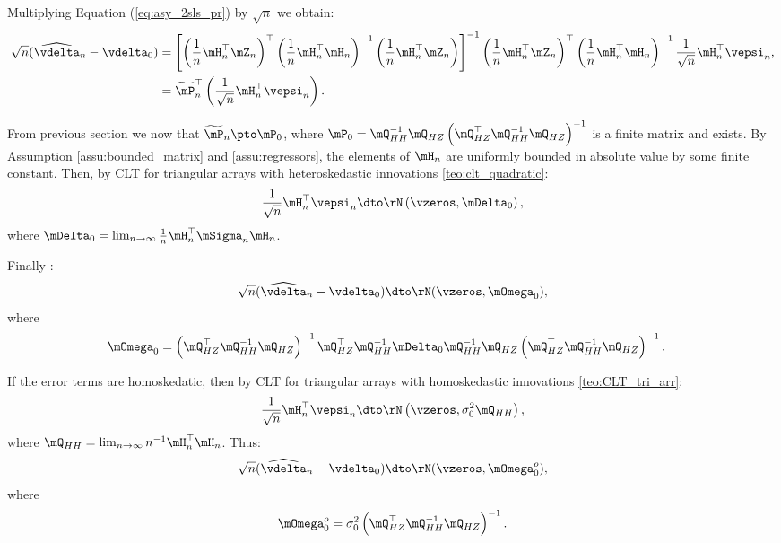 Multiplying Equation (\ref{eq:asy_2sls_pr}) by $\sqrt{n}$ we obtain:
\begin{equation}\label{eq:asy_2sls_pr2}
\begin{aligned}
\sqrt{n}(\widehat{\vdelta}_{n} - \vdelta_0) & = \left[\left(\frac{1}{n}\mH^\top_n\mZ_n\right)^\top\left(\frac{1}{n}\mH^\top_n\mH_n\right)^{-1}\left(\frac{1}{n}\mH^\top_n\mZ_n\right)\right]^{-1}\left(\frac{1}{n}\mH^\top_n\mZ_n\right)^\top\left(\frac{1}{n}\mH^\top_n\mH_n\right)^{-1}\frac{1}{\sqrt{n}}\mH^\top_n\vepsi_n, \\
             & = \widetilde{\mP}^\top_n\left(\frac{1}{\sqrt{n}}\mH^\top_n\vepsi_n\right).
\end{aligned}
\end{equation}

From previous section we now that $\widetilde{\mP}_n\pto \mP_0$, where $\mP_0=\mQ_{HH}^{-1}\mQ_{HZ}\left(\mQ_{HZ}^\top\mQ_{HH}^{-1}\mQ_{HZ}\right)^{-1}$ is a finite matrix and exists. By Assumption \ref{assu:bounded_matrix} and \ref{assu:regressors}, the elements of $\mH_n$ are uniformly bounded in absolute value by some finite constant. Then, by CLT for triangular arrays with heteroskedastic innovations \ref{teo:clt_quadratic}:
\begin{equation*}
\frac{1}{\sqrt{n}}\mH_n^\top\vepsi_n \dto \rN\left(\vzeros, \mDelta_0\right),
\end{equation*}
%
where $\mDelta_0 = \lim_{n\to\infty} \frac{1}{n}\mH^\top_n\mSigma_n\mH_n$. 

Finally :
\begin{equation*}
\sqrt{n}(\widehat{\vdelta}_{n} - \vdelta_0) \dto \rN(\vzeros, \mOmega_0), 
\end{equation*}
%
where
\begin{equation*}
  \begin{aligned}
      \mOmega_0& = \left(\mQ_{HZ}^\top\mQ_{HH}^{-1}\mQ_{HZ}\right)^{-1}\mQ_{HZ}^\top\mQ_{HH}^{-1}\mDelta_0 \mQ_{HH}^{-1}\mQ_{HZ}\left(\mQ_{HZ}^\top\mQ_{HH}^{-1}\mQ_{HZ}\right)^{-1}.
  \end{aligned}
\end{equation*}

If the error terms are homoskedatic, then by CLT for triangular arrays with homoskedastic innovations \ref{teo:CLT_tri_arr}:
\begin{equation*}
\frac{1}{\sqrt{n}}\mH_n^\top\vepsi_n \dto \rN\left(\vzeros, \sigma^2_0\mQ_{HH}\right),
\end{equation*}
%
where $\mQ_{HH} = \lim_{n \to \infty}n^{-1}\mH_n^\top\mH_n$. Thus:
\begin{equation*}
\sqrt{n}(\widehat{\vdelta}_{n} - \vdelta_0) \dto \rN(\vzeros, \mOmega_0^o),
\end{equation*}
%
where 
\begin{equation*}
\mOmega_0^o = \sigma_{0}^2\left(\mQ_{HZ}^\top\mQ_{HH}^{-1}\mQ_{HZ}\right)^{-1}.
\end{equation*}


